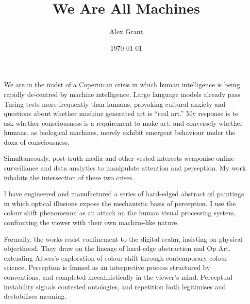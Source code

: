 \documentclass[12pt]{article}
\title{We Are All Machines}
\author{Alex Grant}
\date{\today}
\begin{document}
\onehalfspacing
\maketitle

We are in the midst of a Copernican crisis in which human intelligence is
being rapidly de-centred by machine intelligence. Large language
models already pass Turing tests more frequently than
humans\cite{jones2025largelanguagemodelspass,turing1950,feather2025brainmodelevaluationsneedneuroai},
provoking cultural anxiety and questions about whether machine
generated art is ``real art.'' My response is to ask whether
consciousness is a requirement to make art, and conversely whether
humans, as biological machines, merely exhibit emergent behaviour
under the doxa of consciousness.

Simultaneously,
post-truth\cite{keyes2004posttruth,mcintyre2018posttruth} media and
other vested interests weaponise online surveillance and data
analytics to manipulate attention and
perception\cite{zuboff2019surveillance,steyerl2016sea}. My work
inhabits the intersection of these two crises.

I have engineered and manufactured a series of hard-edged abstract oil
paintings in which optical illusions expose the mechanistic basis of
perception. I use the colour shift phenomenon as an attack on the
human visual processing system, confronting the viewer with their own
machine-like nature.

Formally, the works resist confinement to the digital
realm\cite{zylinska2020ai,steyerl2017duty}, insisting on physical
objecthood\cite{fontana1947spatial,merleauponty1964eye}. They draw on
the lineage of hard-edge
abstraction\cite{Greenberg1961,Alloway1975,Judd1965,Fried1968,Follin2004EmbodiedVisions}
and Op Art\cite{Riley2019EyesMind,Seitz1965ResponsiveEye}, extending
Albers’s exploration of colour shift\cite{albers} through contemporary
colour
science\cite{HurvichJameson1957,Land1977,SchnapfKraftBaylor1987}. Perception
is framed as an interpretive process structured by
conventions\cite{popper1972objective,gombrich1960art}, and completed
mecahnistically in the viewer's
mind\cite{merleauPonty1962phenomenology,barthes1977death,evertz09documentary}. Perceptual
instability signals contested ontologies\cite{kuhn1970structure}, and
repetition both
legitimises\cite{benjamin1935kunstwerk,arendt1972lying,hasher1977frequency}
and destabilises meaning\cite{zuboff2019surveillance}.
\end{document}

